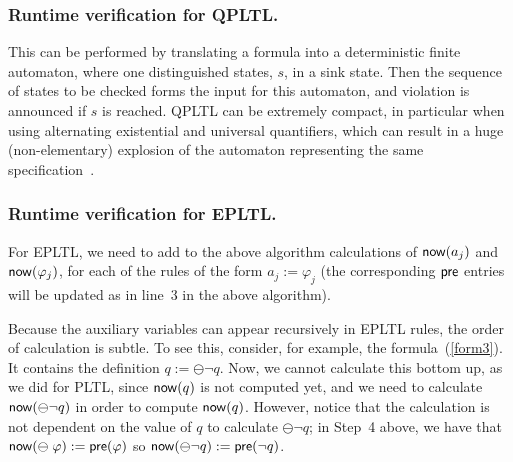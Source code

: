 \subsubsection*{Runtime verification for QPLTL.}  This can be performed by translating a
formula into a deterministic finite automaton, where one distinguished states, $s$, in a sink state.
Then the sequence of states to be checked forms the input for this automaton, and violation is
announced if $s$ is reached.
QPLTL can be extremely compact, in particular when using alternating existential and universal 
quantifiers, which can result in a huge (non-elementary) explosion of
the automaton representing the same
specification~\cite{Thomas}.


\subsubsection*{Runtime verification for EPLTL.} For EPLTL,  we need to  add to the above
algorithm calculations 
of $\mathsf{now} ( a_j )$ and
$\mathsf{now} ( \varphi_j )$, for each of the rules of
the form $a_j := \varphi_j$ (the corresponding
$\mathsf{pre}$ entries will be updated as in line~3 in the above algorithm).


Because the
auxiliary variables can appear recursively in EPLTL rules, the order of calculation is
subtle. To see this, consider, for example, the formula~(\ref{form3}). It contains
the definition $q := \ominus \neg q$. Now, we cannot calculate this
bottom up, as we did for PLTL, since $\mathsf{now} ( q )$ is not computed yet, and we need 
to calculate $\mathsf{now} ( \ominus \neg q )$ in order 
to compute $\mathsf{now} ( q )$.
However, notice that the calculation is not dependent on the
value of $q$ to calculate $\ominus \neg q$; 
in Step~4 above, we have that
$\mathsf{now} ( \ominus \; \varphi ) := \mathsf{pre} ( \varphi )$
so  $\mathsf{now} ( \ominus \neg q ) := \mathsf{pre} ( \neg q )$.


